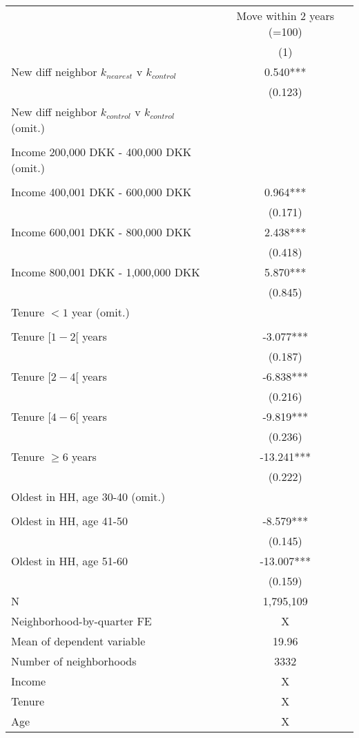 \begin{tabular}{lc}
\toprule
 & Move within 2 years (=100) \\ 
\cmidrule(lr){2-2}
  & (1) \\ 
\midrule
New diff neighbor $k_{nearest}$ v $k_{control}$ & 0.540*** \\ 
 & (0.123) \\ 
 New diff neighbor $k_{control}$ v $k_{control}$ (omit.) &  \\ 
 & \\ 
Income 200,000 DKK - 400,000 DKK (omit.) &  \\ 
 & \\ 
Income 400,001 DKK - 600,000 DKK & 0.964*** \\ 
 & (0.171) \\ 
Income 600,001 DKK - 800,000 DKK & 2.438*** \\ 
 & (0.418) \\ 
Income 800,001 DKK - 1,000,000 DKK & 5.870*** \\ 
 & (0.845) \\ 
 Tenure $<1$ year (omit.) &  \\ 
 &  \\ 
Tenure $[1-2[$ years & -3.077*** \\ 
 & (0.187) \\ 
Tenure $[2-4[$ years & -6.838*** \\ 
 & (0.216) \\ 
Tenure $[4-6[$ years & -9.819*** \\ 
 & (0.236) \\ 
 Tenure $\geq 6$ years & -13.241*** \\ 
 & (0.222) \\ 
 Oldest in HH, age 30-40 (omit.) &  \\ 
 & \\ 
Oldest in HH, age 41-50 & -8.579*** \\ 
 & (0.145) \\ 
Oldest in HH, age 51-60 & -13.007*** \\ 
 & (0.159) \\ 
 \midrule
N & 1,795,109 \\ 
Neighborhood-by-quarter FE & X \\ 
Mean of dependent variable & 19.96 \\ 
Number of neighborhoods & 3332 \\ 
Income & X \\ 
Tenure & X \\ 
Age & X \\ 
\bottomrule
\end{tabular}